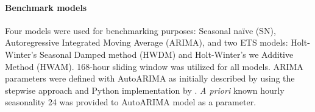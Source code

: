 \paragraph{Benchmark models} Four models were used for benchmarking purposes: Seasonal naïve (SN), Autoregressive Integrated Moving Average (ARIMA), and two ETS models: Holt-Winter's Seasonal Damped method (HWDM) and Holt-Winter's we Additive Method (HWAM). 168-hour sliding window was utilized for all models. ARIMA parameters were defined with AutoARIMA as initially described by \citet{Hyndman2008} using the stepwise approach and Python implementation by \citet{garza2022statsforecast}. \textit{A priori} known hourly seasonality 24 was provided to AutoARIMA model as a parameter.